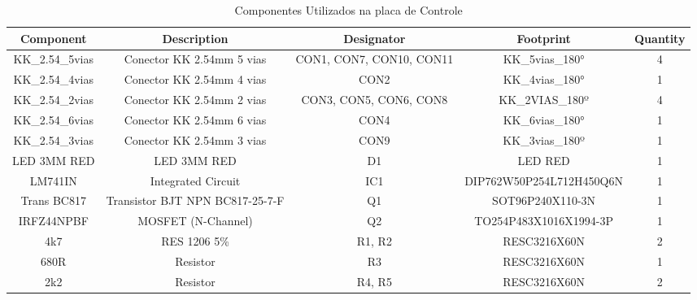 \documentclass[../delivery_hospital_report.tex]{subfiles}
\begin{document}
\begin{table}[]
\caption{Componentes Utilizados na placa de Controle}
\centering
\begin{adjustbox}{width=\columnwidth,center}
\begin{tabular}{|c|c|c|c|c|}
\hline
Component        & Description                                    & Designator                 & Footprint                & Quantity \\ \hline
KK\_2.54\_5vias  & Conector KK 2.54mm 5   vias                    & CON1, CON7, CON10,   CON11 & KK\_5vias\_180°          & 4        \\ \hline
KK\_2.54\_4vias  & Conector KK 2.54mm 4   vias                    & CON2                       & KK\_4vias\_180°          & 1        \\ \hline
KK\_2.54\_2vias  & Conector KK 2.54mm 2   vias                    & CON3, CON5, CON6,   CON8   & KK\_2VIAS\_180º          & 4        \\ \hline
KK\_2.54\_6vias  & Conector KK 2.54mm 6   vias                    & CON4                       & KK\_6vias\_180°          & 1        \\ \hline
KK\_2.54\_3vias  & Conector KK 2.54mm 3   vias                    & CON9                       & KK\_3vias\_180º          & 1        \\ \hline
LED 3MM RED      & LED 3MM RED                                    & D1                         & LED RED                  & 1        \\ \hline
LM741IN          & Integrated Circuit                             & IC1                        & DIP762W50P254L712H450Q6N & 1        \\ \hline
Trans BC817      & Transistor BJT NPN   BC817-25-7-F              & Q1                         & SOT96P240X110-3N         & 1        \\ \hline
IRFZ44NPBF       & MOSFET (N-Channel)                             & Q2                         & TO254P483X1016X1994-3P   & 1        \\ \hline
4k7              & RES 1206 5\%                                   & R1, R2                     & RESC3216X60N             & 2        \\ \hline
680R             & Resistor                                       & R3                         & RESC3216X60N             & 1        \\ \hline
2k2              & Resistor                                       & R4, R5                     & RESC3216X60N             & 2        \\ \hline

\end{tabular}
\end{adjustbox}
\end{table}
\end{document}
